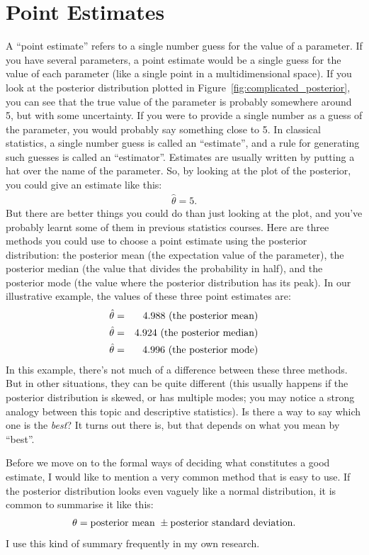 \section{Point Estimates}
A ``point estimate'' refers to a single number guess for the value of a parameter.
If you have several parameters, a point estimate would be a single guess for the
value of each parameter (like a single point in a multidimensional space).
If you look at the
posterior distribution plotted in Figure~\ref{fig:complicated_posterior}, you
can see that the true value of the parameter is probably somewhere around 5,
but with some uncertainty. If you were to provide a single number as a guess of
the parameter, you would probably say something close to 5. In classical statistics, a
single number guess is called an ``estimate'', and a rule for generating such
guesses is called an ``estimator''. Estimates are usually written by putting a
hat over the name of the parameter. So, by looking at the plot of the
posterior, you could give an estimate like this:
\begin{eqnarray}
\hat{\theta} = 5.
\end{eqnarray}
But there are better things you could do than just looking at the plot, and you've
probably learnt some of them
in previous statistics courses. Here are three methods you could use to
choose a point estimate using the posterior distribution: the posterior mean
(the expectation value of the parameter), the posterior median
(the value that divides the probability
in half), and the posterior mode (the value where the posterior distribution has its
peak). In our illustrative example, the values of these three point estimates
are:
\begin{eqnarray}
\hat{\theta} &=& 4.988 \textnormal{ (the posterior mean)}\\
\hat{\theta} &=& 4.924 \textnormal{ (the posterior median)}\\
\hat{\theta} &=& 4.996 \textnormal{ (the posterior mode)}
\end{eqnarray}
In this example, there's not much of a difference between these three methods.
But in other situations, they can be quite different (this usually happens if
the posterior distribution is skewed, or has multiple modes; you may notice a
strong analogy between this topic and descriptive statistics). Is there a way
to say which one is the {\it best}? It turns out there is, but that
depends on what you mean by ``best''.

Before we move on to the formal ways of deciding what constitutes a good estimate, I would
like to mention a very common method that is easy to use. If the posterior distribution
looks even vaguely like a normal distribution, it is common to summarise it like
this:
\begin{eqnarray}
\theta = \textnormal{posterior mean }\pm\textnormal{posterior standard deviation}.
\end{eqnarray}
I use this kind of summary frequently in my own research.

